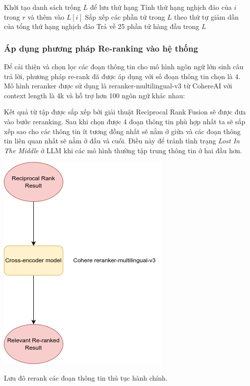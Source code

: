 \documentclass[a4paper, 12pt, openany]{book}
\begin{document}
\begin{algorithmic}[1]
    \STATE Khởi tạo danh sách trống $L$ để lưu thứ hạng
            \STATE Tính thứ hạng nghịch đảo của $i$ trong $r$ và thêm vào $L[i]$
        \ENDFOR
    \ENDFOR
    \STATE Sắp xếp các phần tử trong $L$ theo thứ tự giảm dần của tổng thứ hạng nghịch đảo
    \STATE Trả về 25 phần tử hàng đầu trong $L$
\end{algorithmic}

\subsubsection{Áp dụng phương pháp Re-ranking vào hệ thống}

Để cải thiện và chọn lọc các đoạn thông tin cho mô hình ngôn ngữ lớn sinh câu trả lời, phương pháp re-rank đã được áp dụng
với số đoạn thông tin chọn là 4. Mô hình reranker được sử dụng là reranker-multilingual-v3 từ CohereAI với context length là 4k và hỗ trợ hơn 100 ngôn ngữ khác nhau:

Kết quả từ tập được sắp xếp bởi giải thuật Reciprocal Rank Fusion sẽ được đưa vào bước reranking. Sau khi chọn 
được 4 đoạn thông tin phù hợp nhất ta sẽ sắp xếp sao cho các thông tin ít tương đồng nhất sẽ nằm ở giữa và
các đoạn thông tin liên quan nhất sẽ nằm ở đầu và cuối. Điều này để tránh tình trạng \textit{Lost In The Middle} ở LLM khi
các mô hình thường tập trung thông tin ở hai đầu hơn.

\vspace{0.5cm}
\begin{minipage}{\linewidth}
    \centering
    \includegraphics[width=.5\linewidth]{./assets/images/reranking1.png}
    \captionsetup{type=figure}
    \caption{Lưu đô rerank các đoạn thông tin thủ tục hành chính.}
\end{minipage}
\end{document}
